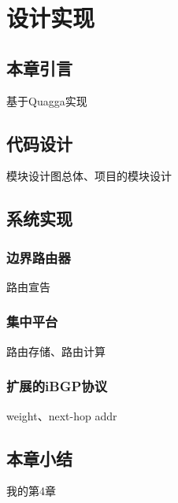 \chapter{设计实现}
\label{cha:china}



\section{本章引言}
基于Quagga实现

\section{代码设计}
模块设计图总体、项目的模块设计


\section{系统实现}

\subsection{边界路由器}
路由宣告
\subsection{集中平台}
路由存储、路由计算
\subsection{扩展的iBGP协议}
weight、next-hop addr
\section{本章小结}
我的第4章
